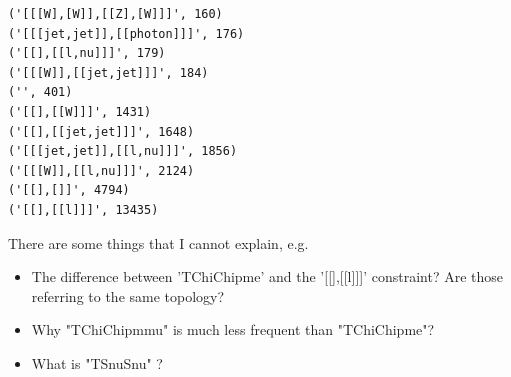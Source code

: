 \documentclass[a4paper,11pt]{article}
\begin{document}
\begin{verbatim}
('[[[W],[W]],[[Z],[W]]]', 160)
('[[[jet,jet]],[[photon]]]', 176)
('[[],[[l,nu]]]', 179)
('[[[W]],[[jet,jet]]]', 184)
('', 401)
('[[],[[W]]]', 1431)
('[[],[[jet,jet]]]', 1648)
('[[[jet,jet]],[[l,nu]]]', 1856)
('[[[W]],[[l,nu]]]', 2124)
('[[],[]]', 4794)
('[[],[[l]]]', 13435)
\end{verbatim}

There are some things that I cannot explain, e.g.
\begin{itemize}
	\item The difference between 'TChiChipme' and the '[[],[[l]]]' constraint? Are those referring to the same topology? \\
	\item Why "TChiChipmmu" is much less frequent than "TChiChipme"? 
	\item What is "TSnuSnu" ?
\end{itemize}


  



\clearpage
\end{document}

